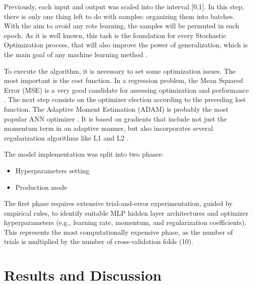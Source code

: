 \documentclass[review]{elsarticle}
\begin{document}
Previously, each input and output was scaled into the interval [0,1]. In this step, there is only one thing left to do with samples: organizing them into batches. With the aim to avoid any rote learning, the samples will be permuted in each epoch. As it is well known, this task is the foundation for every Stochastic Optimization process, that will also improve the power of generalization, which is the main goal of any machine learning method \cite{bottou2018optimization}.

To execute the algorithm, it is necessary to set some optimization issues. The most important is the cost function. In a regression problem, the Mean Squared Error (MSE) is a very good candidate for assessing optimization and performance \cite{bishop2006}. The next step consists on the optimizer election according to the preceding lost function. The Adaptive Moment Estimation (ADAM) is probably the most popular ANN optimizer \cite{choi2020survey}. It is based on gradients that include not just the momentum term in an adaptive manner, but also incorporates several regularization algorithms like L1 and L2 \cite{kingma2015adam}.

The model implementation was split into two phases:
\begin{itemize}
    \item Hyperparameters setting
    \item Production mode
\end{itemize}

The first phase requires extensive trial-and-error experimentation, guided by empirical rules, to identify suitable MLP hidden layer architectures and optimizer hyperparameters (e.g., learning rate, momentum, and regularization coefficients). This represents the most computationally expensive phase, as the number of trials is multiplied by the number of cross-validation folds (10).




\section{Results and Discussion}
\end{document}
